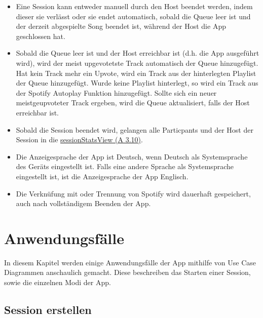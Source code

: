 \documentclass[oneside, ngerman]{sdqtechreport}
\begin{document}
\begin{itemize}
    \item Eine Session kann entweder manuell durch den Host beendet werden, indem dieser sie verlässt oder sie endet automatisch, sobald die Queue leer ist und der derzeit abgespielte Song beendet ist, während der Host die App geschlossen hat.
    \item Sobald die Queue leer ist und der Host erreichbar ist (d.h. die App ausgeführt wird), wird der meist upgevotetste Track automatisch der Queue hinzugefügt. Hat kein Track mehr ein Upvote, wird ein Track aus der hinterlegten Playlist der Queue hinzugefügt. Wurde keine Playlist hinterlegt, so wird ein Track aus der Spotify Autoplay Funktion hinzugefügt. Sollte sich ein neuer meistgeupvoteter Track ergeben, wird die Queue aktualisiert, falls der Host erreichbar ist.
    \item Sobald die Session beendet wird, gelangen alle Particpants und der Host der Session in die \hyperlink{sessionStatsView}{sessionStatsView (A 3.10)}.
    \item Die Anzeigesprache der App ist Deutsch, wenn Deutsch als Systemsprache des Geräts eingestellt ist. Falls eine andere Sprache als Systemsprache eingestellt ist, ist die Anzeigesprache der App Englisch.
    \item Die Verknüfung mit oder Trennung von Spotify wird dauerhaft gespeichert, auch nach vollständigem Beenden der App.
\end{itemize}






\chapter{Anwendungsfälle}
\hypertarget{Anwendungsfaelle}{}
\label{chap:Anwendungsfälle}

In diesem Kapitel werden einige Anwendungsfälle der App mithilfe von Use Case Diagrammen anschaulich gemacht. Diese beschreiben das Starten einer Session, sowie die einzelnen Modi der App.

\section{Session erstellen}
\label{sec:Anwendungsfälle:Session erstellen}
\hypertarget{Session erstellen}{}
\end{document}
